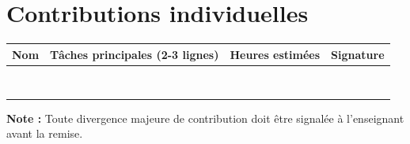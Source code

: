\section{Contributions individuelles}
\label{ann:contributions}

{\renewcommand{\arraystretch}{1.3}
\begin{tabularx}{\linewidth}{@{}p{3.5cm}Xp{2cm}p{3.2cm}@{}}
\toprule
\textbf{Nom} & \textbf{Tâches principales (2-3 lignes)} & \textbf{Heures estimées} & \textbf{Signature} \\
\midrule
\rule{0pt}{3.5em} & & & \\ \midrule
\rule{0pt}{3.5em} & & & \\ \midrule
\rule{0pt}{3.5em} & & & \\ \midrule
\rule{0pt}{3.5em} & & & \\ \midrule
\rule{0pt}{3.5em} & & & \\ \midrule
\rule{0pt}{3.5em} & & & \\ \midrule
\rule{0pt}{3.5em} & & & \\ \midrule
\rule{0pt}{3.5em} & & & \\
\bottomrule
\end{tabularx}}

\medskip
\noindent\textbf{Note :} Toute divergence majeure de contribution doit être signalée à l'enseignant avant la remise.
